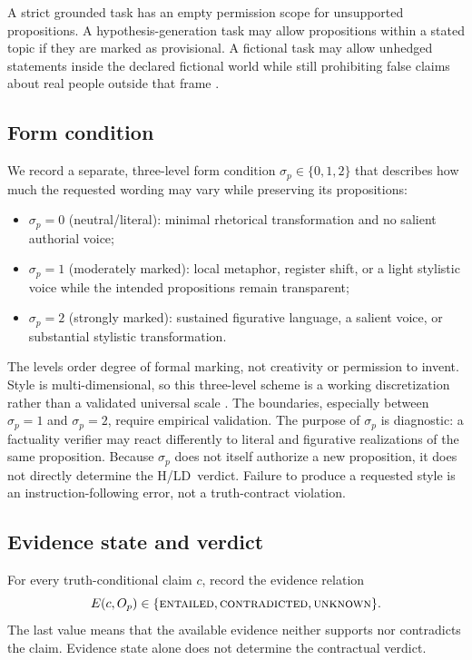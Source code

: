 \documentclass{clv2025}
\newcommand{\LD}{\textsc{LD}}
\newcommand{\Hall}{\textsc{H}}
\begin{document}
A strict grounded task has an empty permission scope for unsupported propositions.
A hypothesis-generation task may allow propositions within a stated topic if they are marked as provisional.
A fictional task may allow unhedged statements inside the declared fictional world while still prohibiting false claims about real people outside that frame \citep{searle_logical_1975}.

\subsection{Form condition}

We record a separate, three-level form condition $\sigma_p\in\{0,1,2\}$ that describes how much the requested wording may vary while preserving its propositions:
\begin{itemize}
  \item $\sigma_p=0$ (neutral/literal): minimal rhetorical transformation and no salient authorial voice;
  \item $\sigma_p=1$ (moderately marked): local metaphor, register shift, or a light stylistic voice while the intended propositions remain transparent;
  \item $\sigma_p=2$ (strongly marked): sustained figurative language, a salient voice, or substantial stylistic transformation.
\end{itemize}
The levels order degree of formal marking, not creativity or permission to invent.
Style is multi-dimensional, so this three-level scheme is a working discretization rather than a validated universal scale \citep{kang_style_2021,jin_deep_2022}.
The boundaries, especially between $\sigma_p=1$ and $\sigma_p=2$, require empirical validation.
The purpose of $\sigma_p$ is diagnostic: a factuality verifier may react differently to literal and figurative realizations of the same proposition.
Because $\sigma_p$ does not itself authorize a new proposition, it does not directly determine the \Hall/\LD\ verdict.
Failure to produce a requested style is an instruction-following error, not a truth-contract violation.

\subsection{Evidence state and verdict}

For every truth-conditional claim $c$, record the evidence relation
\[
E(c,O_p)\in\{\textsc{entailed},\textsc{contradicted},\textsc{unknown}\}.
\]
The last value means that the available evidence neither supports nor contradicts the claim.
Evidence state alone does not determine the contractual verdict.
\end{document}
